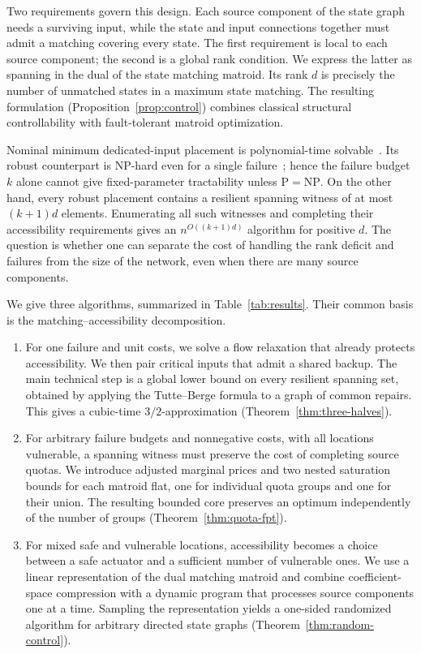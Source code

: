 \documentclass[11pt]{article}
\theoremstyle{definition}
\theoremstyle{remark}\newtheorem{remark}[theorem]{Remark}
\begin{document}
Two requirements govern this design. Each source component of the
state graph needs a surviving input, while the state and input
connections together must admit a matching covering every state.
The first requirement is local to each source component; the second
is a global rank condition. We express the latter as spanning in the
dual of the state matching matroid. Its rank $d$ is precisely the
number of unmatched states in a maximum state matching. The resulting
formulation (Proposition~\ref{prop:control}) combines classical
structural controllability with fault-tolerant matroid optimization.

Nominal minimum dedicated-input placement is polynomial-time
solvable~\cite{PKA}. Its robust counterpart is NP-hard even for a
single failure~\cite{PPR}; hence the failure budget $k$ alone cannot
give fixed-parameter tractability unless $\mathrm P=\mathrm{NP}$.
On the other hand, every robust placement contains a resilient
spanning witness of at most $(k+1)d$ elements. Enumerating all such
witnesses and completing their accessibility requirements gives an
$n^{O((k+1)d)}$ algorithm for positive $d$. The question is whether
one can separate the cost of handling the rank deficit and failures
from the size of the network, even when there are many source
components.

We give three algorithms, summarized in Table~\ref{tab:results}.
Their common basis is the matching--accessibility decomposition.

\begin{enumerate}[leftmargin=*]
\item For one failure and unit costs, we solve a flow relaxation
that already protects accessibility. We then pair critical inputs
that admit a shared backup. The main technical step is a global
lower bound on every resilient spanning set, obtained by applying
the Tutte--Berge formula to a graph of common repairs.
This gives a cubic-time $3/2$-approximation
(Theorem~\ref{thm:three-halves}).

\item For arbitrary failure budgets and nonnegative costs, with all
locations vulnerable, a spanning witness must preserve the cost of
completing source quotas. We introduce adjusted marginal prices
and two nested saturation bounds for each matroid flat, one for
individual quota groups and one for their union. The resulting
bounded core preserves an optimum independently of the number of
groups (Theorem~\ref{thm:quota-fpt}).

\item For mixed safe and vulnerable locations, accessibility becomes
a choice between a safe actuator and a sufficient number of
vulnerable ones. We use a linear representation of the dual
matching matroid and combine coefficient-space compression
with a dynamic program that processes source components one at a
time. Sampling the representation yields a one-sided randomized
algorithm for arbitrary directed state graphs
(Theorem~\ref{thm:random-control}).
\end{enumerate}
\end{document}
